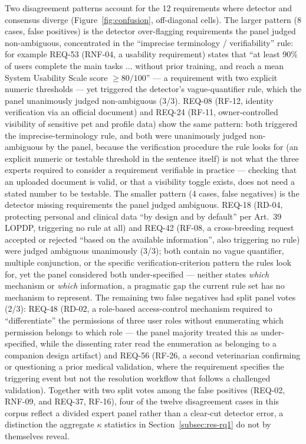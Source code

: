 \documentclass[pdflatex,sn-mathphys-num]{sn-jnl}
\theoremstyle{thmstyleone}%
\theoremstyle{thmstyletwo}%
\theoremstyle{thmstylethree}%
\begin{document}
	Two disagreement patterns account for the 12 requirements where detector and
	consensus diverge (Figure~\ref{fig:confusion}, off-diagonal cells). The larger
	pattern (8 cases, false positives) is the detector over-flagging requirements
	the panel judged non-ambiguous, concentrated in the ``imprecise terminology /
	verifiability'' rule: for example REQ-53 (RNF-04, a usability requirement)
	states that ``at least 90\% of users complete the main tasks $\ldots$ without
	prior training, and reach a mean System Usability Scale score $\geq 80/100$''
	--- a requirement with two explicit numeric thresholds --- yet triggered the
	detector's vague-quantifier rule, which the panel unanimously judged
	non-ambiguous (3/3). REQ-08 (RF-12, identity verification via an official
	document) and REQ-24 (RF-11, owner-controlled visibility of sensitive pet and
	profile data) show the same pattern: both triggered the imprecise-terminology
	rule, and both were unanimously judged non-ambiguous by the panel, because the
	verification procedure the rule looks for (an explicit numeric or testable
	threshold in the sentence itself) is not what the three experts required to
	consider a requirement verifiable in practice --- checking that an uploaded
	document is valid, or that a visibility toggle exists, does not need a stated
	number to be testable. The smaller pattern (4 cases, false negatives) is the
	detector missing requirements the panel judged ambiguous. REQ-18 (RD-04,
	protecting personal and clinical data ``by design and by default'' per
	Art.\ 39 LOPDP, triggering no rule at all) and REQ-42 (RF-08, a
	cross-breeding request accepted or rejected ``based on the available
	information'', also triggering no rule) were judged ambiguous unanimously
	(3/3); both contain no vague quantifier, multiple conjunction, or the
	specific verification-criterion pattern the rules look for, yet the panel
	considered both under-specified --- neither states \emph{which} mechanism or
	\emph{which} information, a pragmatic gap the current rule set has no
	mechanism to represent. The remaining two false negatives had split panel
	votes (2/3): REQ-48 (RD-02, a role-based access-control mechanism required
	to ``differentiate'' the permissions of three user roles without
	enumerating which permission belongs to which role --- the panel majority
	treated this as under-specified, while the dissenting rater read the
	enumeration as belonging to a companion design artifact) and REQ-56 (RF-26,
	a second veterinarian confirming or questioning a prior medical validation,
	where the requirement specifies the triggering event but not the
	resolution workflow that follows a challenged validation). Together with
	two split votes among the false positives (REQ-02, RNF-09, and REQ-37,
	RF-16), four of the twelve disagreement cases in this corpus reflect a
	divided expert panel rather than a clear-cut detector error, a distinction
	the aggregate $\kappa$ statistics in Section~\ref{subsec:res-rq1} do not by
	themselves reveal.
	
\end{document}
